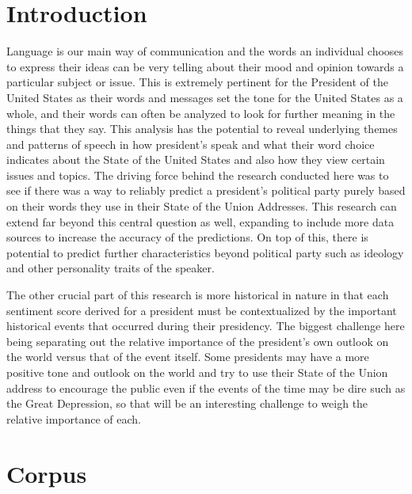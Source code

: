 \documentclass[reqno,12pt,oneside,letter]{report}
\begin{document}

\chapter{Introduction}
Language is our main way of communication and the words an individual chooses to express their ideas can be very telling about their mood and opinion towards a particular subject or issue.
This is extremely pertinent for the President of the United States as their words and messages set the tone for the United States as a whole, and their words can often be analyzed to look for further meaning in the things that they say.
This analysis has the potential to reveal underlying themes and patterns of speech in how president's speak and what their word choice indicates about the State of the United States and also how they view certain issues and topics.
The driving force behind the research conducted here was to see if there was a way to reliably predict a president's political party purely based on their words they use in their State of the Union Addresses.
This research can extend far beyond this central question as well, expanding to include more data sources to increase the accuracy of the predictions.
On top of this, there is potential to predict further characteristics beyond political party such as ideology and other personality traits of the speaker.

The other crucial part of this research is more historical in nature in that each sentiment score derived for a president must be contextualized by the important historical events that occurred during their presidency.
The biggest challenge here being separating out the relative importance of the president's own outlook on the world versus that of the event itself.
Some presidents may have a more positive tone and outlook on the world and try to use their State of the Union address to encourage the public even if the events of the time may be dire such as the Great Depression, so that will be an interesting challenge to weigh the relative importance of each.

\chapter{Corpus}
\end{document}
